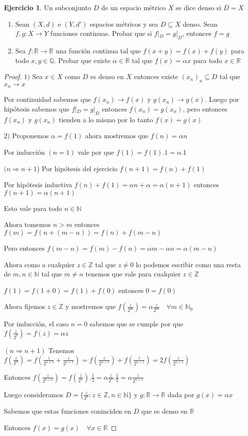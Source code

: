 \documentclass[12pt]{article}
\newcommand{\Q}{\mathbb{Q}}
\newcommand{\R}{\mathbb{R}}
\newcommand{\Z}{\mathbb{Z}}
\newcommand{\N}{\mathbb{N}}
\newcommand{\Ra}{\Rightarrow}
\newcommand{\ra}{\rightarrow}
\newcommand{\ol}{\overline}
\theoremstyle{definition}
\newtheorem{ej}{Ejercicio}
\begin{document}
 \begin{ej}
   Un subconjunto $D$ de un espacio métrico $X$ se dice denso si $\ol D = X$
   \begin{enumerate}
     \item Sean $(X,d)$ e $(Y,d')$ espacios métricos y sea $D \subseteq X$ denso. Sean $f,g: X \ra Y$ funciones continuas. Probar que si $f|_D = g|_D$, entonces $f =g$
     \item Sea $f: \R \ra \R$ una función continua tal que $f(x+y) = f(x) + f(y)$ para todo $x,y \in \Q$. Probar que existe $\alpha \in \R$ tal que $f(x) = \alpha x$ para todo $x \in \R$
   \end{enumerate}
   \begin{proof}
 $1)$  Sea $x \in X$ como $D$ es denso en $X$ entonces existe $(x_n)_n \subseteq D$ tal que $x_n \ra x$

 Por continuidad sabemos que $f(x_n) \ra f(x)$ y $g(x_n) \ra g(x)$. Luego por hipótesis sabemos que $f|_D = g|_D$ entonces $f(x_n) = g(x_n)$, pero entonces $f(x_n)$ y $g(x_n)$ tienden a lo mismo por lo tanto $f(x) = g(x)$

 $2)$ Proponemos $\alpha = f(1)$ ahora mostremos que $f(n) = \alpha n$

 Por inducción $(n = 1) $ vale por que $f(1) = f(1).1 = \alpha . 1$
 
 $(n \Ra n+1$) Por hipótesis del ejercicio $f(n +1 ) =f(n) + f(1) $

 Por hipótesis inductiva $f(n) + f(1)= \alpha n + \alpha = \alpha (n+1)$ entonces $f(n+1) = \alpha (n+1)$

 Esto vale para todo $n \in \N$
 
 Ahora tomemos $n > m$ entonces $f(m) = f(n + (m -n)) = f(n) + f(m-n)$ 

 Pero entonces $f(m -n) = f(m) - f(n) = \alpha m - \alpha n = \alpha (m - n)$ 

 Ahora como a cualquier $z \in \Z$ tal que $z \neq 0$ lo podemos escribir como una resta de $m,n \in \N$ tal que $m \neq n$ tenemos que vale para cualquier $z \in \Z$ 

 $f(1) = f(1 + 0) = f(1) + f(0)$ entonces $0 = f(0)$

 Ahora fijemos $z \in \Z$ y mostremos que $f(\frac{z}{2^m}) = \alpha \frac{z}{2^m} \quad \forall m \in \N_0$

 Por inducción, el caso $n=0$ sabemos que se cumple por que $f(\frac{z}{2^0}) = f(z) = \alpha z$

 $(n \Ra n+1)$ Tenemos $f(\frac{z}{2^{n}}) = f(\frac{z}{2^{n+1}} + \frac{z}{2^{n+1}}) = f(\frac{z}{2^{n+1}}) + f(\frac{z}{2^{n+1}}) =2f(\frac{z}{2^{n+1}}) $

 Entonces $f(\frac{z}{2^{n+1}}) = f (\frac{z}{2^n}).\frac{1}{2} = \alpha \frac {z}{2^n}.\frac{1}{2} = \alpha \frac{z}{2^{n+1}}$

 Luego consideramos $D = \{\frac{z}{2^n}: z \in \Z , n \in \N \}$ y $g : \R \ra \R$ dada por $g(x) = \alpha x$

 Sabemos que estas funciones coninciden en $D$ que es denso en $\R$ 

 Entonces $f(x) = g(x) \quad \forall x \in \R$
   \end{proof}
 \end{ej}
\end{document}
